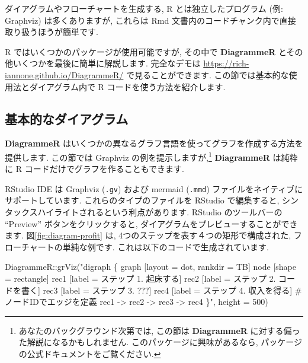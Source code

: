 \documentclass[
  11pt,
  lualatex,ja=standard,jafont=noto]{bxjsreport}
\newenvironment{Shaded}{\begin{snugshade}}{\end{snugshade}}
\newcommand{\AttributeTok}[1]{\textcolor[rgb]{0.77,0.63,0.00}{#1}}
\newcommand{\DecValTok}[1]{\textcolor[rgb]{0.00,0.00,0.81}{#1}}
\newcommand{\FunctionTok}[1]{\textcolor[rgb]{0.00,0.00,0.00}{#1}}
\newcommand{\NormalTok}[1]{#1}
\newcommand{\SpecialCharTok}[1]{\textcolor[rgb]{0.00,0.00,0.00}{#1}}
\newcommand{\StringTok}[1]{\textcolor[rgb]{0.31,0.60,0.02}{#1}}
\begin{document}
ダイアグラムやフローチャートを生成する, R とは独立したプログラム (例: Graphviz) は多くありますが, これらは Rmd 文書内のコードチャンク内で直接取り扱うほうが簡単です.

R ではいくつかのパッケージが使用可能ですが, その中で \textbf{DiagrammeR} \autocite{R-DiagrammeR} とその他いくつかを最後に簡単に解説します. 完全なデモは \url{https://rich-iannone.github.io/DiagrammeR/} で見ることができます. この節では基本的な使用法とダイアグラム内で R コードを使う方法を紹介します.

\hypertarget{basic-diagrams}{%
\subsection{基本的なダイアグラム}\label{basic-diagrams}}

\textbf{DiagrammeR} はいくつかの異なるグラフ言語を使ってグラフを作成する方法を提供します. この節では Graphviz の例を提示しますが,\footnote{あなたのバックグラウンド次第では, この節は \textbf{DiagrammeR} に対する偏った解説になるかもしれません. このパッケージに興味があるなら, パッケージの公式ドキュメントをご覧ください.} \textbf{DiagrammeR} は純粋に R コードだけでグラフを作ることもできます.

RStudio IDE は Graphviz (\texttt{.gv}) および mermaid (\texttt{.mmd}) ファイルをネイティブにサポートしています. これらのタイプのファイルを RStudio で編集すると, シンタックスハイライトされるという利点があります. RStudio のツールバーの ``Preview'' ボタンをクリックすると, ダイアグラムをプレビューすることができます. 図\ref{fig:diagram-profit} は, 4つのステップを表す４つの矩形で構成された, フローチャートの単純な例です. これは以下のコードで生成されています.

\begin{Shaded}
\begin{Highlighting}[numbers=left,,]
\NormalTok{DiagrammeR}\SpecialCharTok{::}\FunctionTok{grViz}\NormalTok{(}\StringTok{"digraph \{}
\StringTok{  graph [layout = dot, rankdir = TB]}
\StringTok{  }
\StringTok{  node [shape = rectangle]        }
\StringTok{  rec1 [label = \textquotesingle{}ステップ 1. 起床する\textquotesingle{}]}
\StringTok{  rec2 [label = \textquotesingle{}ステップ 2. コードを書く\textquotesingle{}]}
\StringTok{  rec3 [label = \textquotesingle{}ステップ 3. ???\textquotesingle{}]}
\StringTok{  rec4 [label = \textquotesingle{}ステップ 4. 収入を得る\textquotesingle{}]}
\StringTok{  }
\StringTok{  \# ノードIDでエッジを定義}
\StringTok{  rec1 {-}\textgreater{} rec2 {-}\textgreater{} rec3 {-}\textgreater{} rec4}
\StringTok{  \}"}\NormalTok{, }
  \AttributeTok{height =} \DecValTok{500}\NormalTok{)}
\end{Highlighting}
\end{Shaded}
\end{document}
